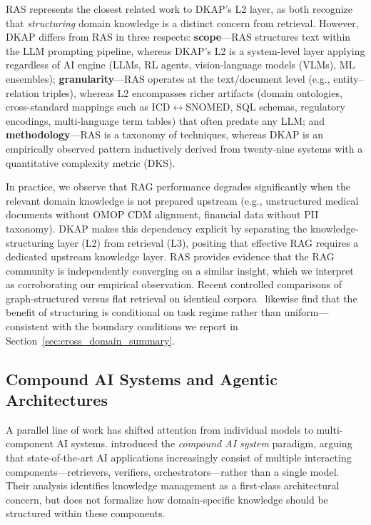 \documentclass[fleqn,10pt,lineno]{wlpeerj}
\begin{document}
RAS represents the closest related work to DKAP's L2 layer, as both recognize that \textit{structuring} domain knowledge is a distinct concern from retrieval. However, DKAP differs from RAS in three respects: \textbf{scope}---RAS structures text within the LLM prompting pipeline, whereas DKAP's L2 is a system-level layer applying regardless of AI engine (LLMs, RL agents, vision-language models (VLMs), ML ensembles); \textbf{granularity}---RAS operates at the text/document level (e.g., entity--relation triples), whereas L2 encompasses richer artifacts (domain ontologies, cross-standard mappings such as ICD$\leftrightarrow$SNOMED, SQL schemas, regulatory encodings, multi-language term tables) that often predate any LLM; and \textbf{methodology}---RAS is a taxonomy of techniques, whereas DKAP is an empirically observed pattern inductively derived from twenty-nine systems with a quantitative complexity metric (DKS).

In practice, we observe that RAG performance degrades significantly when the relevant domain knowledge is not prepared upstream (e.g., unstructured medical documents without OMOP CDM alignment, financial data without PII taxonomy). DKAP makes this dependency explicit by separating the knowledge-structuring layer (L2) from retrieval (L3), positing that effective RAG requires a dedicated upstream knowledge layer. RAS provides evidence that the RAG community is independently converging on a similar insight, which we interpret as corroborating our empirical observation. Recent controlled comparisons of graph-structured versus flat retrieval on identical corpora~\citep{xiang2026graphragbench} likewise find that the benefit of structuring is conditional on task regime rather than uniform---consistent with the boundary conditions we report in Section~\ref{sec:cross_domain_summary}.

\subsection{Compound AI Systems and Agentic Architectures}

A parallel line of work has shifted attention from individual models to multi-component AI systems. \citet{zaharia2024compound} introduced the \textit{compound AI system} paradigm, arguing that state-of-the-art AI applications increasingly consist of multiple interacting components---retrievers, verifiers, orchestrators---rather than a single model. Their analysis identifies knowledge management as a first-class architectural concern, but does not formalize how domain-specific knowledge should be structured within these components.
\end{document}
